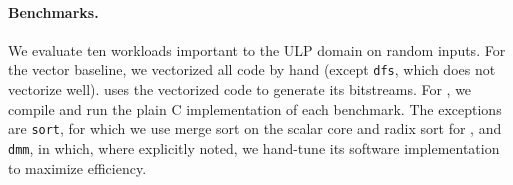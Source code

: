 \paragraph{Benchmarks.}
We evaluate ten workloads important to the ULP domain on random inputs.
% 
For the vector baseline, we vectorized all code by hand (except {\tt dfs}, which does not 
vectorize well).
% 
\snafu uses the vectorized code to generate its bitstreams.
% 
For \riptide, we compile and run the plain C implementation of each benchmark.
%
The exceptions are {\tt sort}, for which we use merge sort on the scalar core and
radix sort for \riptide,
and {\tt dmm}, in which, where explicitly noted, we hand-tune its software implementation to maximize efficiency.
% 

